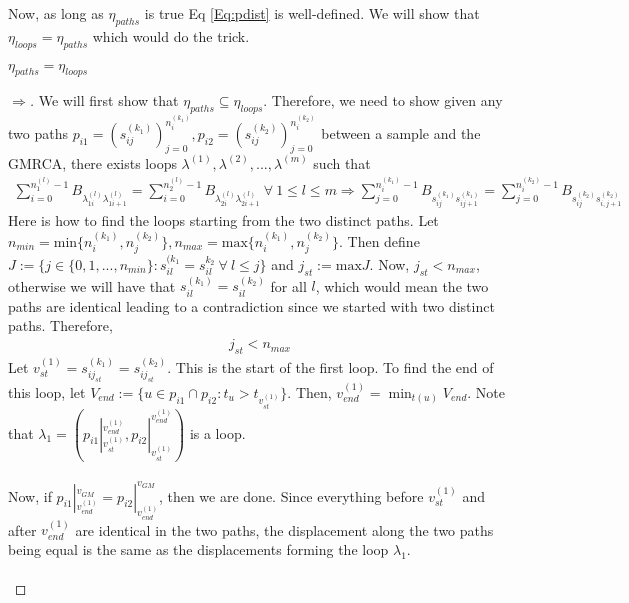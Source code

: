 Now, as long as $\eta_{paths}$ is true Eq \ref{Eq:pdist} is well-defined. We will show that $\eta_{loops} = \eta_{paths}$ which would do the trick. 

\begin{lemma} $\eta_{paths} = \eta_{loops}$ 
\end{lemma}
\begin{proof}
[$\Rightarrow$] We will first show that $\eta_{paths} \subseteq \eta_{loops} $. Therefore, we need to show given any two paths $p_{i1} = (s_{ij}^{(k_1) } )_{j=0}^{n_i^{(k_1)}}, p_{i2} = (s_{ij}^{(k_2)} )_{j=0}^{n_i^{(k_2)}}$ between a sample and the GMRCA, there exists loops $\lambda^{(1)},\lambda^{(2)},...,\lambda^{(m)}$ such that 
\begin{eqnarray*}
    \displaystyle \sum_{i=0}^{n_1^{(l)}-1} B_{\lambda_{1i}^{(l)} \lambda_{1i+1}^{(l)} } = \sum_{i=0}^{n_2^{(l)}-1} B_{\lambda_{2i}^{(l)} \lambda_{2i+1}^{(l)} } \ \forall \ 1 \leq l \leq m \Rightarrow \sum_{j=0}^{n_i^{(k_1)}-1} B_{s_{ij}^{(k_1)}  s_{ij+1}^{(k_1)} } = \sum_{j=0}^{n_i^{(k_2)}-1} B_{s_{ij}^{(k_2)}  s_{i,j+1}^{(k_2)} }
\end{eqnarray*}
Here is how to find the loops starting from the two distinct paths. Let $n_{min} = \text{min}\{ n_i^{(k_1)},n_j^{(k_2)} \}, n_{max} = \text{max}\{ n_i^{(k_1)},n_j^{(k_2)} \} $. Then define $J := \{ j \in \{0,1,...,n_{min} \} : s_{il}^{(k_1} = s_{il}^{k_2} \ \forall \ l \leq j \}$ and $j_{st} := \text{max}J $. Now, $j_{st} < n_{max}$, otherwise we will have that $s_{il}^{(k_1)} = s_{il}^{(k_2)} $ for all $l$, which would mean the two paths are identical leading to a contradiction since we started with two distinct paths. Therefore,
\begin{eqnarray*}
    j_{st} < n_{max}
\end{eqnarray*}
Let $v_{st}^{(1)} = s_{ij_{st}}^{(k_1)} = s_{ij_{st}}^{(k_2)} $. This is the start of the first loop. To find the end of this loop, let $V_{end} := \{ u \in p_{i1} \cap p_{i2} : t_u > t_{v_{st}^{(1)}} \} $. Then, $v_{end}^{(1)} = \displaystyle \min_{t(u)} V_{end} $. Note that $\lambda_1 = ( p_{i1}|_{v_{st}^{(1)}}^{v_{end}^{(1)}}, p_{i2}|_{v_{st}^{(1)}}^{v_{end}^{(1)}})$ is a loop. \\ \\ 
Now, if $p_{i1} |_{v_{end}^{(1)}}^{v_{GM}} = p_{i2} |_{v_{end}^{(1)}}^{v_{GM}} $, then we are done. Since everything before $v_{st}^{(1)}$ and after $v_{end}^{(1)}$ are identical in the two paths, the displacement along the two paths being equal is the same as the displacements forming the loop $\lambda_1$. \\ \\

\end{proof}
